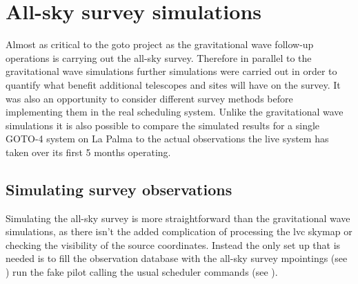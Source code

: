 \begin{colsection}
\begin{colsection}
\end{colsection}


\end{colsection}


\newpage
\section{All-sky survey simulations}
\label{sec:survey_sims}
\begin{colsection}


\begin{colsection}

Almost as critical to the \gls{goto} project as the gravitational wave follow-up operations is carrying out the all-sky survey. Therefore in parallel to the gravitational wave simulations further simulations were carried out in order to quantify what benefit additional telescopes and sites will have on the survey. It was also an opportunity to consider different survey methods before implementing them in the real scheduling system. Unlike the gravitational wave simulations it is also possible to compare the simulated results for a single GOTO-4 system on La Palma to the actual observations the live system has taken over its first 5 months operating.

\end{colsection}


\subsection{Simulating survey observations}
\label{sec:survey_sim_methods}
\begin{colsection}

Simulating the all-sky survey is more straightforward than the gravitational wave simulations, as there isn't the added complication of processing the \gls{lvc} skymap or checking the visibility of the source coordinates. Instead the only set up that is needed is to fill the observation database with the all-sky survey mpointings (see ) run the fake pilot calling the usual scheduler commands (see ).


\end{colsection}
\end{colsection}
